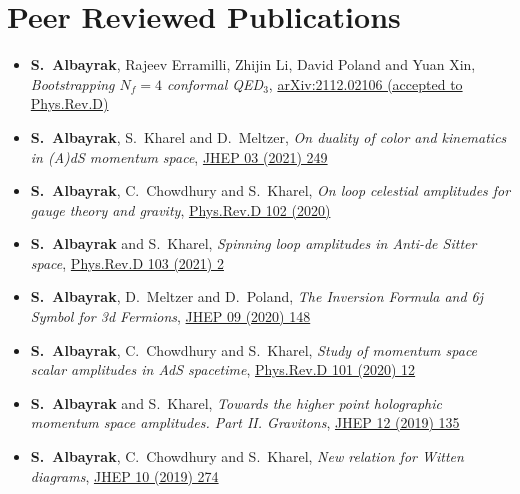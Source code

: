 \documentclass[a4paper,11pt]{article}
\begin{document}
 \section{\textcolor{burntorange}{Peer Reviewed Publications}}
 \begin{itemize}%
 	
  	\item[] {\bf S.~Albayrak}, Rajeev Erramilli, Zhijin Li, David Poland  and Yuan Xin, \emph{Bootstrapping $N_f=4$ conformal QED$_3$}, \hyperref{https://arxiv.org/abs/2112.02106}{category}{name}{arXiv:2112.02106 (accepted to Phys.Rev.D)}
 	
  	\item[] {\bf S.~Albayrak}, { S.~Kharel} and {D.~Meltzer}, \emph{On duality of color and kinematics in (A)dS momentum space}, \hyperref{https://inspirehep.net/literature/1837623}{category}{name}{JHEP 03 (2021) 249}
 	\item[] {\bf S.~Albayrak}, C.~Chowdhury and  { S.~Kharel}, \emph{On loop celestial amplitudes for gauge theory and gravity}, \hyperref{https://inspirehep.net/literature/1807927}{category}{name}{ Phys.Rev.D 102 (2020)}
 	
 \item[] {\bf S.~Albayrak} and  { S.~Kharel}, \emph{Spinning loop amplitudes in Anti-de Sitter space}, \hyperref{https://inspirehep.net/literature/1802534}{category}{name}{Phys.Rev.D 103 (2021) 2} 
 
 \item[] {\bf S.~Albayrak}, D.~Meltzer and  { D.~Poland}, \emph{The Inversion Formula and 6j Symbol for 3d Fermions}, \hyperref{https://inspirehep.net/files/ff4743ee85b68ab8565052dbd4928f62}{category}{name}{JHEP 09 (2020) 148}
 
 \item[] {\bf S.~Albayrak}, C.~Chowdhury and  { S.~Kharel}, \emph{Study of momentum space scalar amplitudes in AdS spacetime}, \hyperref{https://inspirehep.net/files/950d888f8dbaf39b96ea1bee25d6bda0}{category}{name}{Phys.Rev.D 101 (2020) 12}
 
 \item[] {\bf S.~Albayrak} and  { S.~Kharel}, \emph{Towards the higher point holographic momentum space amplitudes. Part II. Gravitons}, \hyperref{https://inspirehep.net/files/eb148d7ad84e19945017f5ab2aa85393}{category}{name}{JHEP 12 (2019) 135}
 
 \item[] {\bf S.~Albayrak}, C.~Chowdhury and  { S.~Kharel}, \emph{New relation for Witten diagrams}, \hyperref{https://inspirehep.net/files/44b75a5187c14730a849c04e3b909bd3}{category}{name}{JHEP 10 (2019) 274}
 

\end{itemize}
\end{document}
